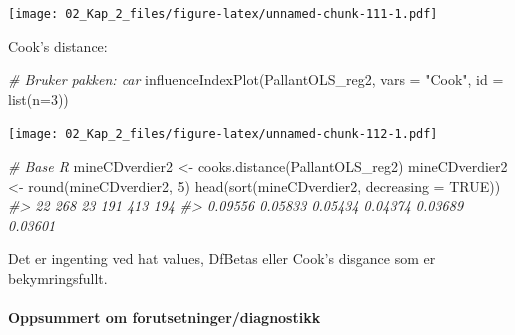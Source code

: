 \documentclass[
]{article}
\newenvironment{Shaded}{\begin{snugshade}}{\end{snugshade}}
\newcommand{\AttributeTok}[1]{\textcolor[rgb]{0.77,0.63,0.00}{#1}}
\newcommand{\CommentTok}[1]{\textcolor[rgb]{0.56,0.35,0.01}{\textit{#1}}}
\newcommand{\ConstantTok}[1]{\textcolor[rgb]{0.00,0.00,0.00}{#1}}
\newcommand{\DecValTok}[1]{\textcolor[rgb]{0.00,0.00,0.81}{#1}}
\newcommand{\FunctionTok}[1]{\textcolor[rgb]{0.00,0.00,0.00}{#1}}
\newcommand{\NormalTok}[1]{#1}
\newcommand{\OtherTok}[1]{\textcolor[rgb]{0.56,0.35,0.01}{#1}}
\newcommand{\StringTok}[1]{\textcolor[rgb]{0.31,0.60,0.02}{#1}}
\begin{document}
\texttt{[image: 02\_Kap\_2\_files/figure-latex/unnamed-chunk-111-1.pdf]}

Cook's distance:

\begin{Shaded}
\begin{Highlighting}[]
\CommentTok{\# Bruker pakken: car}
\FunctionTok{influenceIndexPlot}\NormalTok{(PallantOLS\_reg2, }\AttributeTok{vars =} \StringTok{"Cook"}\NormalTok{, }\AttributeTok{id =} \FunctionTok{list}\NormalTok{(}\AttributeTok{n=}\DecValTok{3}\NormalTok{))}
\end{Highlighting}
\end{Shaded}

\texttt{[image: 02\_Kap\_2\_files/figure-latex/unnamed-chunk-112-1.pdf]}

\begin{Shaded}
\begin{Highlighting}[]
\CommentTok{\# Base R}
\NormalTok{mineCDverdier2 }\OtherTok{\textless{}{-}} \FunctionTok{cooks.distance}\NormalTok{(PallantOLS\_reg2)}
\NormalTok{mineCDverdier2 }\OtherTok{\textless{}{-}} \FunctionTok{round}\NormalTok{(mineCDverdier2, }\DecValTok{5}\NormalTok{)}
\FunctionTok{head}\NormalTok{(}\FunctionTok{sort}\NormalTok{(mineCDverdier2, }\AttributeTok{decreasing =} \ConstantTok{TRUE}\NormalTok{))}
\CommentTok{\#\textgreater{}      22     268      23     191     413     194 }
\CommentTok{\#\textgreater{} 0.09556 0.05833 0.05434 0.04374 0.03689 0.03601}
\end{Highlighting}
\end{Shaded}

Det er ingenting ved hat values, DfBetas eller Cook's disgance som er bekymringsfullt.

\hypertarget{oppsummert-om-forutsetningerdiagnostikk}{%
\paragraph{Oppsummert om forutsetninger/diagnostikk}\label{oppsummert-om-forutsetningerdiagnostikk}}
\end{document}
